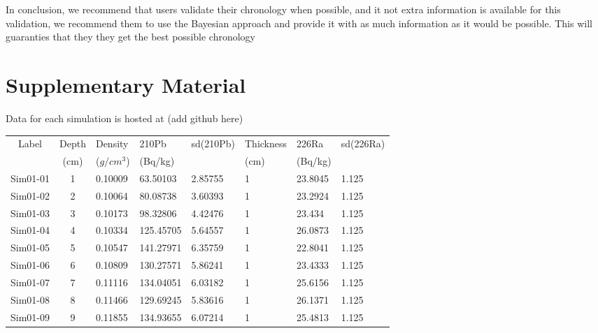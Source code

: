 \documentclass [10pt] {article}
\begin{document}
In conclusion, we recommend that users validate their chronology when possible, and it not extra information is available for this validation, we recommend them to use the Bayesian approach and provide it with as much information as it would be possible. 
This will guaranties that they they get the best possible chronology






\newpage


\section{Supplementary Material}
\label{sec:supp_mat}
Data for each simulation is hosted at (add github here)
\newpage
\begin{table}[H]
	\begin{tabular}{c|cllllll}
		Label    & Depth & Density  & 210Pb & sd(210Pb) & Thickness& 226Ra  & sd(226Ra) \\
		& (cm) &($g/cm^3$) &(Bq/kg)& & (cm) & (Bq/kg)&\\
		\hline 
		Sim01-01 & 1          & 0.10009                         & 63.50103      & 2.85755   & 1              & 23.8045       & 1.125     \\
		Sim01-02 & 2          & 0.10064                         & 80.08738      & 3.60393   & 1              & 23.2924       & 1.125     \\
		Sim01-03 & 3          & 0.10173                         & 98.32806      & 4.42476   & 1              & 23.434        & 1.125     \\
		Sim01-04 & 4          & 0.10334                         & 125.45705     & 5.64557   & 1              & 26.0873       & 1.125     \\
		Sim01-05 & 5          & 0.10547                         & 141.27971     & 6.35759   & 1              & 22.8041       & 1.125     \\
		Sim01-06 & 6          & 0.10809                         & 130.27571     & 5.86241   & 1              & 23.4333       & 1.125     \\
		Sim01-07 & 7          & 0.11116                         & 134.04051     & 6.03182   & 1              & 25.6156       & 1.125     \\
		Sim01-08 & 8          & 0.11466                         & 129.69245     & 5.83616   & 1              & 26.1371       & 1.125     \\
		Sim01-09 & 9          & 0.11855                         & 134.93655     & 6.07214   & 1              & 25.4813       & 1.125     \\

\end{tabular}
\end{table}
\end{document}
